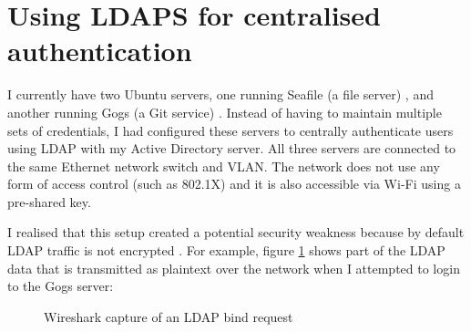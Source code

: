 \documentclass[11pt,a4paper]{scrartcl}
\begin{document}
\newpage

\section*{Using LDAPS for centralised authentication}
\begin{refsection}

I currently have two Ubuntu servers, one running Seafile (a file server) \cite{seafile}, and another running Gogs (a Git service) \cite{gogs}. Instead of having to maintain multiple sets of credentials, I had configured these servers to centrally authenticate users using LDAP with my Active Directory server. All three servers are connected to the same Ethernet network switch and VLAN. The network does not use any form of access control (such as 802.1X) and it is also accessible via Wi-Fi using a pre-shared key.

I realised that this setup created a potential security weakness because by default LDAP traffic is not encrypted \cite{microsoft_enable_ldaps}. For example, figure \ref{fig:wireshark_ldap} shows part of the LDAP data that is transmitted as plaintext over the network when I attempted to login to the Gogs server:

\begin{figure}[h]
	\centering
	\qquad
	\caption{Wireshark capture of an LDAP bind request}
	\label{fig:wireshark_ldap}
\end{figure}


\end{refsection}
\end{document}
